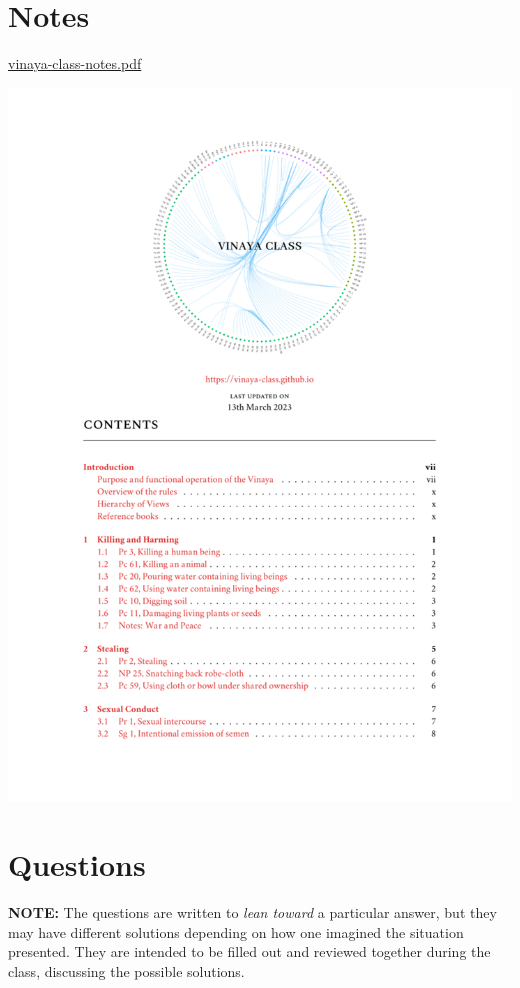 \section{Notes}

\href{./includes/docs/vinaya-class-notes.pdf}{vinaya-class-notes.pdf}

\href{./includes/docs/vinaya-class-notes.pdf}{\includegraphics{./includes/docs/vinaya-class-notes-thumb.png}}

\section{Questions}

\textbf{NOTE:} The questions are written to \emph{lean toward} a
particular answer, but they may have different solutions depending on
how one imagined the situation presented. They are intended to be filled
out and reviewed together during the class, discussing the possible
solutions.

